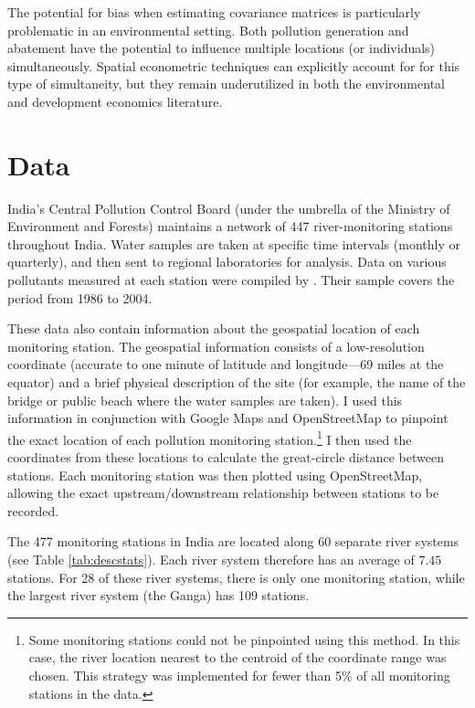 \documentclass[12pt]{article}
\renewcommand{\citet}[1]{\citeauthor{#1} \citeyearpar{#1}}
\newcommand{\gha}{\citet{greenstone2014} }
\begin{document}
The potential for bias when estimating covariance matrices is particularly problematic in an environmental setting. Both pollution generation and abatement have the potential to influence multiple locations (or individuals) simultaneously. Spatial econometric techniques can explicitly account for for this type of simultaneity, but they remain underutilized in both the environmental and development economics literature.

\section{Data} \label{sec:data}

India's Central Pollution Control Board (under the umbrella of the Ministry of Environment and Forests) maintains a network of 447 river-monitoring stations throughout India. Water samples are taken at specific time intervals (monthly or quarterly), and then sent to regional laboratories for analysis. Data on various pollutants measured at each station were compiled by \gha. Their sample covers the period from 1986 to 2004. 

These data also contain information about the geospatial location of each monitoring station. The geospatial information consists of a low-resolution coordinate (accurate to one minute of latitude and longitude---69 miles at the equator) and a brief physical description of the site (for example, the name of the bridge or public beach where the water samples are taken). I used this information in conjunction with Google Maps and OpenStreetMap to pinpoint the exact location of each pollution monitoring station.\footnote{Some monitoring stations could not be pinpointed using this method. In this case, the river location nearest to the centroid of the coordinate range was chosen. This strategy was implemented for fewer than 5\% of all monitoring stations in the data.} I then used the coordinates from these locations to calculate the great-circle distance between stations. Each monitoring station was then plotted using OpenStreetMap, allowing the exact upstream/downstream relationship between stations to be recorded. 

The 477 monitoring stations in India are located along 60 separate river systems (see Table \ref{tab:descstats}). Each river system therefore has an average of $7.45$ stations. For 28 of these river systems, there is only one monitoring station, while the largest river system (the Ganga) has 109 stations. 
\end{document}
